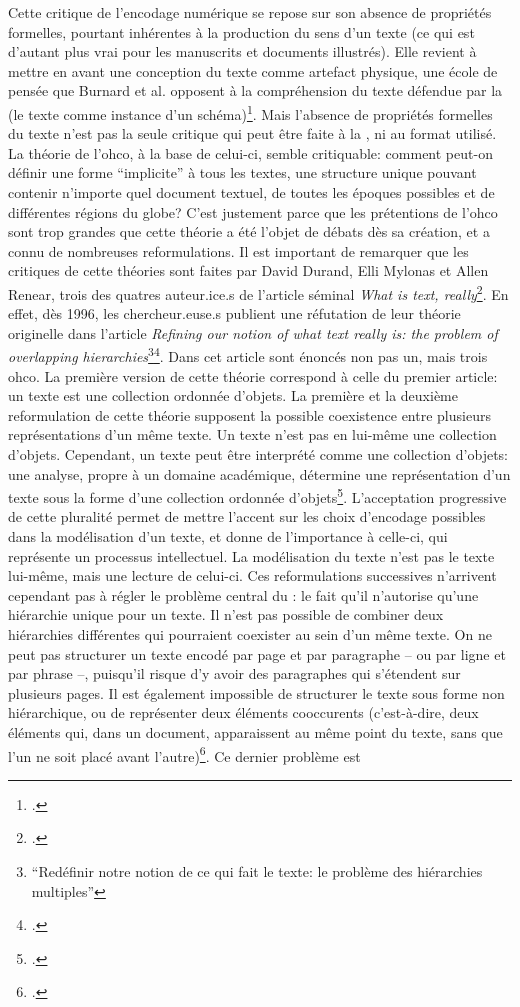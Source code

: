 Cette critique de l'encodage numérique se repose sur son absence de propriétés formelles, pourtant inhérentes à la production du sens d'un texte (ce qui est d'autant plus vrai pour les manuscrits et documents illustrés). Elle revient à mettre en avant une conception du texte comme artefact physique, une école de pensée que Burnard et al. opposent à la compréhension du texte défendue par la \tei{} (le texte comme instance d'un schéma)\footcite[§ 3]{burnard_search_2021}. Mais l'absence de propriétés formelles du texte n'est pas la seule critique qui peut être faite à la \tei{}, ni au format \xml{} utilisé. La théorie de l'\gls{ohco}, à la base de celui-ci, semble critiquable: comment peut-on définir une forme \enquote{implicite} à tous les textes, une structure unique pouvant contenir n'importe quel document textuel, de toutes les époques possibles et de différentes régions du globe? C'est justement parce que les prétentions de l'\gls{ohco} sont trop grandes que cette théorie a été l'objet de débats dès sa création, et a connu de nombreuses reformulations. Il est important de remarquer que les critiques de cette théories sont faites par David Durand, Elli Mylonas et Allen Renear, trois des quatres auteur.ice.s de l'article séminal \textit{What is text, really}\footcite{derose_what_1990}. En effet, dès 1996, les chercheur.euse.s publient une réfutation de leur théorie originelle dans l'article \textit{Refining our notion of what text really is: the problem of overlapping hierarchies}\footnote{\enquote{Redéfinir notre notion de ce qui fait le texte: le problème des hiérarchies multiples}}\footcite{renear_refining_1996}. Dans cet article sont énoncés non pas un, mais trois \gls{ohco}. La première version de cette théorie correspond à celle du premier article: un texte est une collection ordonnée d'objets. La première et la deuxième reformulation de cette théorie supposent la possible coexistence entre plusieurs représentations d'un même texte. Un texte n'est pas en lui-même une collection d'objets. Cependant, un texte peut être interprété comme une collection d'objets: une analyse, propre à un domaine académique, détermine une représentation d'un texte sous la forme d'une collection ordonnée d'objets\footcite{renear_refining_1996}. L'acceptation progressive de cette pluralité permet de mettre l'accent sur les choix d'encodage possibles dans la modélisation d'un texte, et donne de l'importance à celle-ci, qui représente un processus intellectuel. La modélisation du texte n'est pas le texte lui-même, mais une lecture de celui-ci. Ces reformulations successives n'arrivent cependant pas à régler le problème central du \xml{}: le fait qu'il n'autorise qu'une hiérarchie unique pour un texte. Il n'est pas possible de combiner deux hiérarchies différentes qui pourraient coexister au sein d'un même texte. On ne peut pas structurer un texte encodé par page et par paragraphe -- ou par ligne et par phrase --, puisqu'il risque d'y avoir des paragraphes qui s'étendent sur plusieurs pages. Il est également impossible de structurer le texte sous forme non hiérarchique, ou de représenter deux éléments cooccurents (c'est-à-dire, deux éléments qui, dans un document, apparaissent au même point du texte, sans que l'un ne soit placé avant l'autre)\footcite{bleeker_texts_2021}. Ce dernier problème est 